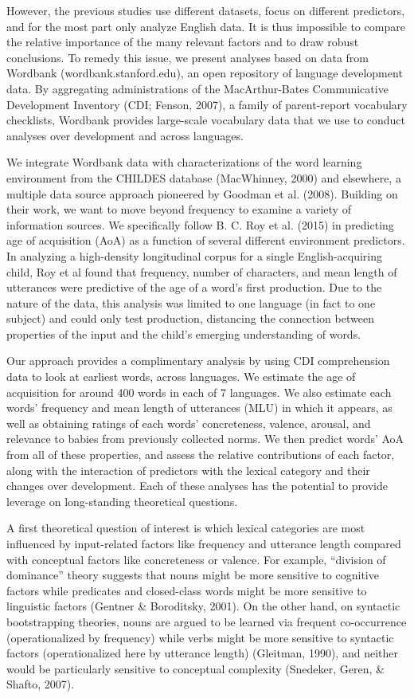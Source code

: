 \documentclass[10pt, letterpaper]{article}
\begin{document}
However, the previous studies use different datasets, focus on different
predictors, and for the most part only analyze English data. It is thus
impossible to compare the relative importance of the many relevant
factors and to draw robust conclusions. To remedy this issue, we present
analyses based on data from Wordbank (wordbank.stanford.edu), an open
repository of language development data. By aggregating administrations
of the MacArthur-Bates Communicative Development Inventory (CDI; Fenson,
2007), a family of parent-report vocabulary checklists, Wordbank
provides large-scale vocabulary data that we use to conduct analyses
over development and across languages.

We integrate Wordbank data with characterizations of the word learning
environment from the CHILDES database (MacWhinney, 2000) and elsewhere,
a multiple data source approach pioneered by Goodman et al. (2008).
Building on their work, we want to move beyond frequency to examine a
variety of information sources. We specifically follow B. C. Roy et al.
(2015) in predicting age of acquisition (AoA) as a function of several
different environment predictors. In analyzing a high-density
longitudinal corpus for a single English-acquiring child, Roy et al
found that frequency, number of characters, and mean length of
utterances were predictive of the age of a word's first production. Due
to the nature of the data, this analysis was limited to one language (in
fact to one subject) and could only test production, distancing the
connection between properties of the input and the child's emerging
understanding of words.

Our approach provides a complimentary analysis by using CDI
comprehension data to look at earliest words, across languages. We
estimate the age of acquisition for around 400 words in each of 7
languages. We also estimate each words' frequency and mean length of
utterances (MLU) in which it appears, as well as obtaining ratings of
each words' concreteness, valence, arousal, and relevance to babies from
previously collected norms. We then predict words' AoA from all of these
properties, and assess the relative contributions of each factor, along
with the interaction of predictors with the lexical category and their
changes over development. Each of these analyses has the potential to
provide leverage on long-standing theoretical questions.

A first theoretical question of interest is which lexical categories are
most influenced by input-related factors like frequency and utterance
length compared with conceptual factors like concreteness or valence.
For example, ``division of dominance'' theory suggests that nouns might
be more sensitive to cognitive factors while predicates and closed-class
words might be more sensitive to linguistic factors (Gentner \&
Boroditsky, 2001). On the other hand, on syntactic bootstrapping
theories, nouns are argued to be learned via frequent co-occurrence
(operationalized by frequency) while verbs might be more sensitive to
syntactic factors (operationalized here by utterance length) (Gleitman,
1990), and neither would be particularly sensitive to conceptual
complexity (Snedeker, Geren, \& Shafto, 2007).
\end{document}
